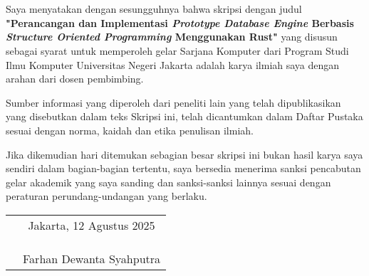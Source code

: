 \chapter*{}
\onehalfspacing{}

Saya menyatakan dengan sesungguhnya bahwa skripsi dengan judul
\textbf{"Perancangan dan Implementasi \emph{Prototype Database Engine} Berbasis \emph{Structure Oriented Programming} Menggunakan Rust"} yang disusun sebagai syarat untuk memperoleh gelar Sarjana Komputer
dari Program Studi Ilmu Komputer Universitas Negeri Jakarta adalah karya ilmiah
saya dengan arahan dari dosen pembimbing.

Sumber informasi yang diperoleh dari peneliti lain yang telah dipublikasikan 
yang disebutkan dalam teks Skripsi ini, telah dicantumkan dalam Daftar Pustaka 
sesuai dengan norma, kaidah dan etika penulisan ilmiah.

Jika dikemudian hari ditemukan sebagian besar skripsi ini bukan hasil karya saya 
sendiri dalam bagian-bagian tertentu, saya bersedia menerima sanksi pencabutan 
gelar akademik yang saya sanding dan sanksi-sanksi lainnya sesuai dengan 
peraturan perundang-undangan yang berlaku.

\vspace{4cm}

\begin{tabular}{p{7.5cm}c}
	&Jakarta, 12 Agustus 2025\\
	&\\
	&\\
	&\\
	&Farhan Dewanta Syahputra
\end{tabular}

